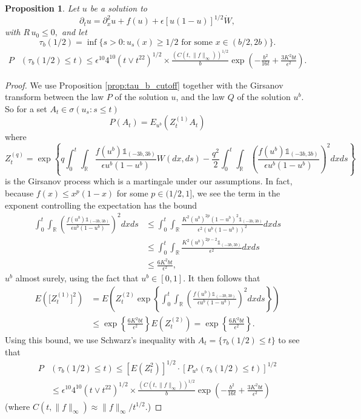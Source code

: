 \documentclass[12pt,a4paper]{amsart}
\numberwithin{equation}{section}
\theoremstyle{plain}
\newtheorem{proposition}[theorem]{Proposition}
\theoremstyle{remark}
\newcommand{\e}{\epsilon}
\newcommand{\R}{\mathbb{R}}
\newcommand{\p}{\partial}
\begin{document}
\begin{proposition}
Let $u$ be a solution to 
\[
\p_t u = \p_x^2 u + f(u) + \e [u(1- u)]^{1/2}\dot{W},
\]
with $R\,u_0 \leq 0,$ and let
\[
\tau_b(1/2) = \inf\{s > 0 : u_s(x) \geq 1/2 \text{ for some $x \in (b/2, 2b)$}\}.
\]
\begin{align}
P&\left(\tau_b(1/2) \leq t\right) \leq \e^{10}4^{10}(t \lor t^{22})^{1/2} \times \frac{(C(t, \|f\|_\infty))^{1/2}}{b}\exp\left(-\frac{b^2}{16t} + \frac{3K^2bt}{\e^2}\right)\label{eq:tau_b}.
\end{align}

\end{proposition}
\begin{proof}
We use Proposition \ref{prop:tau_b_cutoff} together with the Girsanov transform between the
law $P$ of the solution $u$, and the law $Q$ of the solution $u^b$. So for a set $A_t \in \sigma(u_s : s \leq t)$
\[
P(A_t) = E_{u^b}\left(Z_t^{(1)} A_t\right)
\]
where
\[
Z_t^{(q)} = \exp \left\{q\int_0^t\int_\R\frac{f(u^b)\mathds{1}_{(-3b, 3b)}}{\e u^b(1 - u^b)}W(dx, ds) -\frac{q^2}{2}\int_0^t\int_\R\left(\frac{f(u^b)\mathds{1}_{(-3b, 3b)}}{\e u^b(1 - u^b)}\right)^2dxds\right\}
\]
is the Girsanov process which is a martingale under our assumptions. In fact, because $f(x) \leq x^p(1 - x)$ for some $p \in (1/2, 1]$, we see the term in the exponent controlling the expectation has the bound
\begin{align}
\int_0^t\int_\R\left(\frac{f(u^b)\mathds{1}_{(-3b, 3b)}}{\e u^b(1 - u^b)}\right)^2dxds &\leq \int_0^t \int_\R\frac{K^2(u^b)^{2p}(1 - u^b)^2\mathds{1}_{(-3b, 3b)}}{\e^2(u^b(1 - u^b))^2}dxds\\ 
&\leq \int_0^t \int_\R\frac{K^2(u^b)^{2p - 2}\mathds{1}_{(-3b, 3b)}}{\e^2}dxds\\
&\leq \frac{6K^2bt}{\e^2},
\end{align}
$u^b$ almost surely, using the fact that $u^b \in [0, 1].$
It then follows that
\begin{align}
E\left(\big[Z_t^{(1)}\big]^2\right) &= E\left(Z_t^{(2)}\exp\left\{\int_0^t\int_\R\left(\frac{f(u^b)\mathds{1}_{(-3b, 3b)}}{\e u^b(1 - u^b)}\right)^2dxds\right\}\right)\\
&\leq \exp\left\{\frac{6K^2bt}{\e^2}\right\}E(Z_t^{(2)}) =\exp\left\{\frac{6K^2bt}{\e^2}\right\}.
\end{align}
Using this bound, we use Schwarz's inequality with $A_t = \{\tau_b(1/2) \leq t\}$ to see 
that
\begin{align}
P&\left(\tau_b(1/2) \leq t\right) \leq [E\left(Z_t^2\right)]^{1/2}\cdot [P_{u^b}\left(\tau_b(1/2) \leq t\right)]^{1/2}\\
&\leq \e^{10}4^{10}(t \lor t^{22})^{1/2} \times \frac{(C(t, \|f\|_\infty))^{1/2}}{b}\exp\left(-\frac{b^2}{16t} + \frac{3K^2bt}{\e^2}\right)
\end{align}
(where $C(t, \|f\|_\infty) \approx \|f\|_\infty/t^{1/2}$.)
\end{proof}
\end{document}
